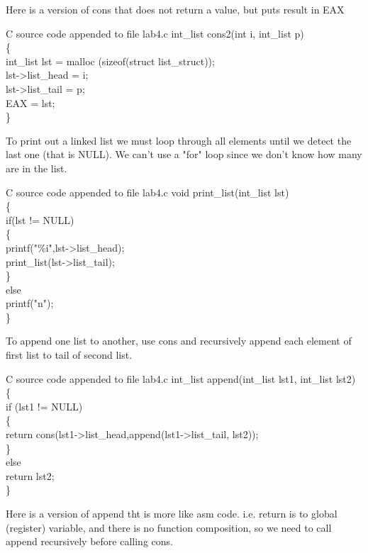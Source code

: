 \documentclass{article}
\begin{document}
Here is a version of cons that does not return a value, but puts result in EAX
\begin{GFT}{C source code appended to file lab4.c}
\+int\_list cons2(int i, int\_list p)\\
\+\{\\
\+  int\_list lst = malloc (sizeof(struct list\_struct));\\
\+  lst->list\_head = i;\\
\+  lst->list\_tail = p;\\
\+  EAX = lst;\\
\+\}\\
\end{GFT}
\pagebreak
To print out a linked list we must loop through all elements until we detect the last one (that is NULL). We can't use a "for" loop since we don't know how many are in the list.
\begin{GFT}{C source code appended to file lab4.c}
\+void print\_list(int\_list lst)\\
\+\{\\
\+  if(lst != NULL)\\
\+  \{\\
\+    printf("\%i",lst->list\_head);\\
\+    print\_list(lst->list\_tail);\\
\+  \}\\
\+  else\\
\+    printf("\Backslash{}n");\\
\+\}\\
\end{GFT}
To append one list to another, use cons and recursively append each element of first list to tail of second list.
\begin{GFT}{C source code appended to file lab4.c}
\+int\_list append(int\_list lst1, int\_list lst2)\\
\+\{\\
\+  if (lst1 != NULL) \\
\+  \{\\
\+     return cons(lst1->list\_head,append(lst1->list\_tail, lst2));\\
\+  \}\\
\+  else\\
\+    return lst2;\\
\+\}\\
\end{GFT}
\pagebreak
Here is a version of append tht is more like asm code. i.e. return is to global (register) variable, and there is no function composition, so we need to call append recursively before calling cons.
\end{document}
